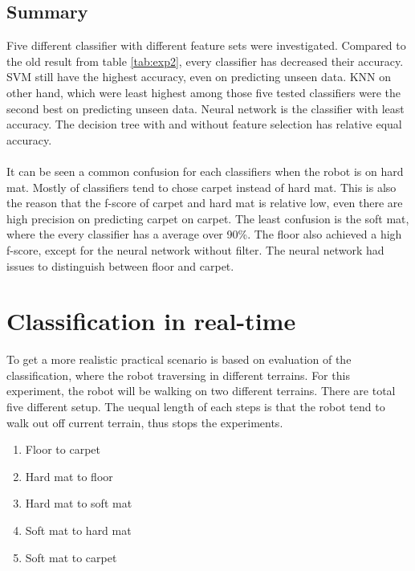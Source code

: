 \documentclass[USenglish]{ifimaster}  %
\begin{document}
\subsection{Summary}
Five different classifier with different feature sets were investigated. Compared to the old result from table \ref{tab:exp2}, every classifier has decreased their accuracy. SVM still have the highest accuracy, even on predicting unseen data. KNN on other hand, which were least highest among those five tested classifiers were the second best on predicting unseen data. Neural network is the classifier with least accuracy. The decision tree with and without feature selection has relative equal accuracy.
\\
\\
It can be seen a common confusion for each classifiers when the robot is on hard mat. Mostly of classifiers tend to chose carpet instead of hard mat. This is also the reason that the f-score of carpet and hard mat is relative low, even there are high precision on predicting carpet on carpet. The least confusion is the soft mat, where the every classifier has a average over 90\%. The floor also achieved a high f-score, except for the neural network without filter. The neural network had issues to distinguish between floor and carpet. 



\section{Classification in real-time} \label{sec:realtime}
To get a more realistic practical scenario  is based on evaluation of the classification, where the robot traversing in different terrains. For this experiment, the robot will be walking on two different terrains. There are total five different setup. The uequal length of each steps is that the robot tend to walk out off current terrain, thus stops the experiments. 


\begin{enumerate}
\item Floor to carpet
\item Hard mat to floor
\item Hard mat to soft mat
\item Soft mat to hard mat
\item Soft mat to carpet
\end{enumerate}
\end{document}
